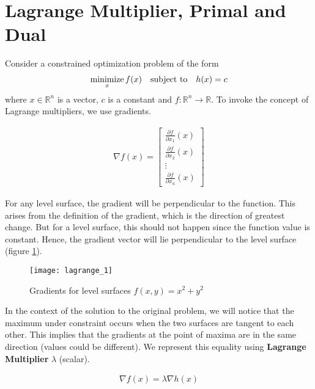 \documentclass[../../statistical_learning_notes.tex]{subfiles}
\begin{document}
\section{Lagrange Multiplier, Primal and Dual}\label{sec:appendix_lagrangian}

Consider a constrained optimization problem of the form
\begin{align*}
    \operatorname*{minimize}_{x} f(x) \quad \text{subject to} \quad h(x) = c
\end{align*}
where $x \in \mathbb{R}^{n}$ is a vector, $c$ is a constant and $f:\mathbb{R}^{n} \rightarrow \mathbb{R}$. To invoke the concept of Lagrange multipliers, we use gradients. 

\begin{align*}
    \nabla f(x) = 
        \begin{bmatrix}
        \frac{\partial f}{\partial x_{1}}(x)\\
        \frac{\partial f}{\partial x_{2}}(x)\\
        \vdots\\
        \frac{\partial f}{\partial x_{n}}(x)
    \end{bmatrix}
\end{align*}

For any level surface, the gradient will be perpendicular to the function. This arises from the definition of the gradient, which is the direction of greatest change. But for a level surface, this should not happen since the function value is constant. Hence, the gradient vector will lie perpendicular to the level surface (figure \ref{fig:lagrange_1}).

\begin{figure}[h]
    \texttt{[image: lagrange\_1]}
    \centering
    \caption {Gradients for level surfaces $f(x,y) = x^{2}+y^{2}$}
    \label{fig:lagrange_1} %
\end{figure}

In the context of the solution to the original problem, we will notice that the maximum under constraint occurs when the two surfaces are tangent to each other. This implies that the gradients at the point of maxima are in the same direction (values could be different). We represent this equality using \textbf{Lagrange Multiplier} $\lambda$ (scalar).

\begin{align*}
    \nabla f(x) = \lambda \nabla h(x)
\end{align*}
\end{document}

